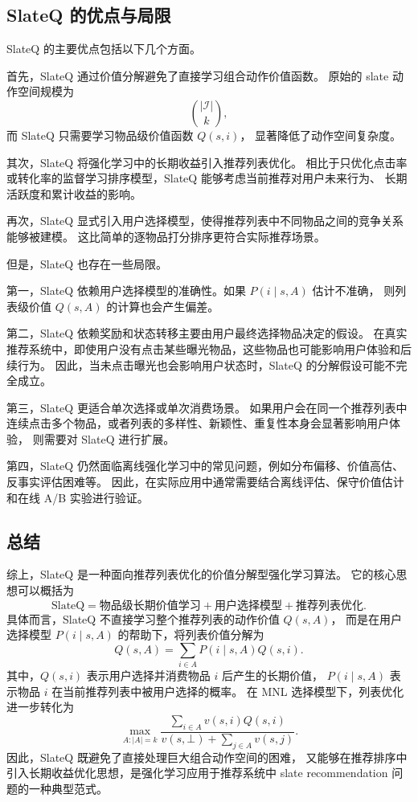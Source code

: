 \documentclass[11pt]{ctexart}
\begin{document}
\subsection{SlateQ 的优点与局限}

SlateQ 的主要优点包括以下几个方面。

首先，SlateQ 通过价值分解避免了直接学习组合动作价值函数。
原始的 slate 动作空间规模为
\[
\binom{|\mathcal{I}|}{k},
\]
而 SlateQ 只需要学习物品级价值函数 $Q(s,i)$，
显著降低了动作空间复杂度。

其次，SlateQ 将强化学习中的长期收益引入推荐列表优化。
相比于只优化点击率或转化率的监督学习排序模型，SlateQ 能够考虑当前推荐对用户未来行为、
长期活跃度和累计收益的影响。

再次，SlateQ 显式引入用户选择模型，使得推荐列表中不同物品之间的竞争关系能够被建模。
这比简单的逐物品打分排序更符合实际推荐场景。

但是，SlateQ 也存在一些局限。

第一，SlateQ 依赖用户选择模型的准确性。如果 $P(i\mid s,A)$ 估计不准确，
则列表级价值 $Q(s,A)$ 的计算也会产生偏差。

第二，SlateQ 依赖奖励和状态转移主要由用户最终选择物品决定的假设。
在真实推荐系统中，即使用户没有点击某些曝光物品，这些物品也可能影响用户体验和后续行为。
因此，当未点击曝光也会影响用户状态时，SlateQ 的分解假设可能不完全成立。

第三，SlateQ 更适合单次选择或单次消费场景。
如果用户会在同一个推荐列表中连续点击多个物品，或者列表的多样性、新颖性、重复性本身会显著影响用户体验，
则需要对 SlateQ 进行扩展。

第四，SlateQ 仍然面临离线强化学习中的常见问题，例如分布偏移、价值高估、反事实评估困难等。
因此，在实际应用中通常需要结合离线评估、保守价值估计和在线 A/B 实验进行验证。

\subsection{总结}

综上，SlateQ 是一种面向推荐列表优化的价值分解型强化学习算法。
它的核心思想可以概括为
\[
\text{SlateQ}
=
\text{物品级长期价值学习}
+
\text{用户选择模型}
+
\text{推荐列表优化}.
\]
具体而言，SlateQ 不直接学习整个推荐列表的动作价值 $Q(s,A)$，
而是在用户选择模型 $P(i\mid s,A)$ 的帮助下，将列表价值分解为
\[
Q(s,A)
=
\sum_{i\in A}P(i\mid s,A)Q(s,i).
\]
其中，$Q(s,i)$ 表示用户选择并消费物品 $i$ 后产生的长期价值，
$P(i\mid s,A)$ 表示物品 $i$ 在当前推荐列表中被用户选择的概率。
在 MNL 选择模型下，列表优化进一步转化为
\[
\max_{A:|A|=k}
\frac{
\sum_{i\in A}v(s,i)Q(s,i)
}{
v(s,\bot)+\sum_{j\in A}v(s,j)
}.
\]
因此，SlateQ 既避免了直接处理巨大组合动作空间的困难，
又能够在推荐排序中引入长期收益优化思想，是强化学习应用于推荐系统中 slate recommendation
问题的一种典型范式。
\end{document}

